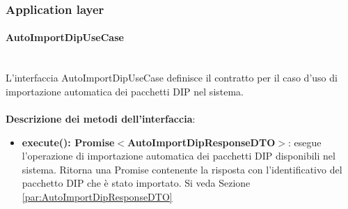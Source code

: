 \documentclass[a4paper,12pt]{article}
\begin{document}
{{            \subsubsection{Application layer} {
                \paragraph{AutoImportDipUseCase}\label{par:AutoImportDipUseCase}\mbox{}\\
                L'interfaccia AutoImportDipUseCase definisce il contratto per il caso d'uso di importazione automatica dei pacchetti DIP nel sistema.\\
                \\
                \noindent \textbf{Descrizione dei metodi dell'interfaccia}:
                \begin{itemize}
                    \item \textbf{execute(): Promise$<$AutoImportDipResponseDTO$>$}: esegue l'operazione di importazione automatica dei pacchetti DIP disponibili nel sistema. Ritorna una Promise contenente la risposta con l’identificativo del pacchetto DIP che è stato importato. Si veda Sezione \ref{par:AutoImportDipResponseDTO}
                \end{itemize}
}}}
\end{document}
